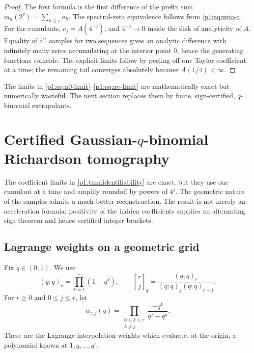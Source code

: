 \documentclass[11pt,oneside]{article}
\numberwithin{equation}{section}
\theoremstyle{definition}
\theoremstyle{remark}
\newcommand{\qbinom}[3]{\genfrac{[}{]}{0pt}{}{#1}{#2}_{#3}}
\begin{document}
\begin{proof}
The first formula is the first difference of the prefix sum
$m_a(2^v)=\sum_{h\le v}a_h$.  The spectral-zeta equivalence follows from
\eqref{p1:eq:zeta-a}.  For the cumulants, $c_j=A(4^{-j})$, and
$4^{-j}\to0$ inside the disk of analyticity of $A$.  Equality of all samples for two
sequences gives an analytic difference with infinitely many zeros accumulating at the
interior point $0$, hence the generating functions coincide.  The explicit limits follow
by peeling off one Taylor coefficient at a time; the remaining tail converges absolutely
because $A(1/4)<\infty$.
\end{proof}

\begin{remark}
The limits in \eqref{p1:eq:a0-limit}--\eqref{p1:eq:av-limit} are mathematically exact but
numerically wasteful.  The next section replaces them by finite, sign-certified,
$q$-binomial extrapolants.
\end{remark}

\section{Certified Gaussian-$q$-binomial Richardson tomography}
\label{p1:sec:tomography}

The coefficient limits in \cref{p1:thm:identifiability} are exact, but they use one cumulant at
a time and amplify roundoff by powers of $4^j$.  The geometric nature of the samples admits
a much better reconstruction.  The result is not merely an acceleration formula: positivity
of the hidden coefficients supplies an alternating sign theorem and hence certified integer
brackets.

\subsection{Lagrange weights on a geometric grid}

Fix $q\in(0,1)$.  We use
\[
 (q;q)_r=\prod_{k=1}^{r}(1-q^k),
 \qquad
 \qbinom{r}{j}{q}=\frac{(q;q)_r}{(q;q)_j(q;q)_{r-j}}.
\]
For $r\ge0$ and $0\le j\le r$, let
\begin{equation}
 w_{r,j}(q)
 =\prod_{\substack{0\le k\le r\\k\ne j}}
   \frac{-q^k}{q^j-q^k}.
 \label{p1:eq:lagrange-weight-product}
\end{equation}
These are the Lagrange interpolation weights which evaluate, at the origin, a polynomial
known at $1,q,\ldots,q^r$.
\end{document}
